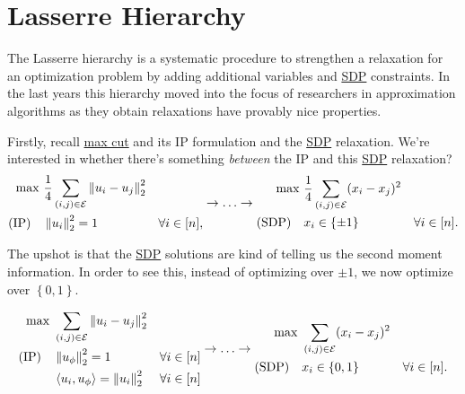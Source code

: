 \section{Lasserre Hierarchy}
The Lasserre hierarchy is a systematic procedure to strengthen a relaxation for an optimization problem by adding additional variables and \hyperref[def:SDP]{SDP} constraints. In the last years this hierarchy moved into the focus of researchers in approximation algorithms as they obtain relaxations have provably nice properties.

Firstly, recall \hyperref[prb:max-cut]{max cut} and its IP formulation and the \hyperref[def:SDP]{SDP} relaxation. We're interested in whether there's something \emph{between} the IP and this \hyperref[def:SDP]{SDP} relaxation?
\[
	\begin{aligned}
		\max~            & \frac{1}{4} \sum_{(i, j)\in \mathcal{\MakeUppercase{e}} } \left\lVert u_i - u_j\right\rVert _2^2                     \\
		(\text{IP})\quad & \left\lVert u_i\right\rVert _2^2 = 1                                                             & \forall i\in [n],
	\end{aligned} \to \ldots \to \begin{aligned}
		\max~             & \frac{1}{4} \sum_{(i, j)\in \mathcal{\MakeUppercase{e}} }  (x_i - x_j)^{2}                     \\
		(\text{SDP})\quad & x_i \in \left\{ \pm 1 \right\}                                             & \forall i\in [n].
	\end{aligned}
\]

The upshot is that the \hyperref[def:SDP]{SDP} solutions are kind of telling us the second moment information. In order to see this, instead of optimizing over \(\pm 1\), we now optimize over \(\left\{ 0, 1 \right\} \).

\[
	\begin{aligned}
		\max~            & \sum_{(i, j)\in \mathcal{\MakeUppercase{e}} } \left\lVert u_i - u_j\right\rVert _2^2                    \\
		(\text{IP})\quad & \left\lVert u_{\phi}\right\rVert _2^2 = 1                                            & \forall i\in [n] \\
		                 & \left\langle u_i, u_{\phi } \right\rangle = \left\lVert u_i\right\rVert _2^2         & \forall i\in [n]
	\end{aligned} \to \ldots \to \begin{aligned}
		\max~             & \sum_{(i, j)\in \mathcal{\MakeUppercase{e}} }  (x_i - x_j)^{2}                     \\
		(\text{SDP})\quad & x_i \in \left\{ 0, 1 \right\}                                  & \forall i\in [n].
	\end{aligned}
\]

